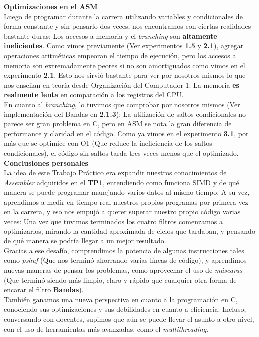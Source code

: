 \documentclass[a4paper]{article}
\begin{document}
\textbf{Optimizaciones en el ASM} \\
Luego de programar durante la carrera utilizando variables y condicionales de forma constante y sin pensarlo dos veces, nos encontramos con ciertas realidades bastante duras: Los accesos a memoria y el \textit{branching} son \textbf{altamente ineficientes}. Como vimos previamente (Ver experimentos \textbf{1.5} y \textbf{2.1}), agregar operaciones aritméticas empeoran el tiempo de ejecución, pero los accesos a memoria son extremadamente peores si no son amortiguados como vimos en el experimento \textbf{2.1}. Esto nos sirvió bastante para ver por nosotros mismos lo que nos enseñan en teoría desde Organización del Computador 1: La memoria \textbf{es realmente lenta} en comparación a los registros del CPU. \\
En cuanto al \textit{branching}, lo tuvimos que comprobar por nosotros mismos (Ver implementación del Bandas en \textbf{2.1.3}): La utilización de saltos condicionales no parece ser gran problema en C, pero en ASM se nota la gran diferencia de performance y claridad en el código. Como ya vimos en el experimento \textbf{3.1}, por más que se optimice con O1 (Que reduce la ineficiencia de los saltos condicionales), el código sin saltos tarda tres veces menos que el optimizado. \\


\textbf{Conclusiones personales} \\
La idea de este Trabajo Práctico era expandir nuestros conocimientos de \textit{Assembler} adquiridos en el \textbf{TP1}, entendiendo como funciona SIMD y de qué manera se puede programar manejando varios datos al mismo tiempo. A su vez, aprendimos a medir en tiempo real nuestros propios programas por primera vez en la carrera, y eso nos empujó a querer superar nuestro propio código varias veces: Una vez que tuvimos terminados los cuatro filtros comenzamos a optimizarlos, mirando la cantidad aproximada de ciclos que tardaban, y pensando de qué manera se podría llegar a un mejor resultado. \\
Gracias a ese desafío, comprendimos la potencia de algunas instrucciones tales como \textit{pshuf} (Que nos terminó ahorrando varias líneas de código), y aprendimos nuevas maneras de pensar los problemas, como aprovechar el uso de \textit{máscaras} (Que terminó siendo más limpio, claro y rápido que cualquier otra forma de encarar el filtro \textbf{Bandas}). \\
También ganamos una nueva perspectiva en cuanto a la programación en C, conociendo sus optimizaciones y sus debilidades en cuanto a eficiencia.
Incluso, conversando con docentes, supimos que aún se puede llevar el asunto a otro nivel, con el uso de herramientas m\'{a}s avanzadas, como el \textit{multithreading}.
\end{document}

